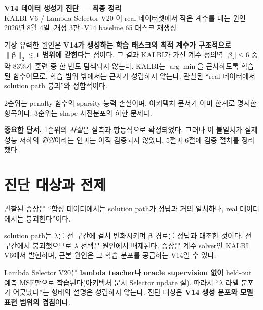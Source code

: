 \documentclass[11pt,a4paper]{article}
\theoremstyle{definition}
\newcommand{\bbeta}{\boldsymbol{\beta}}
\begin{document}
\begin{center}
{\LARGE\bfseries\color{ink} V14 데이터 생성기 진단 --- 최종 정리}\\[0.7em]
{\large\color{mut} KALBI V6 / Lambda Selector V20 이 real 데이터셋에서 작은 계수를 내는 원인}\\[1.2em]
{\small\color{mut} 2026년 8월 4일 \quad$\cdot$\quad 개정 3판 \quad$\cdot$\quad V14 baseline 65 태스크 재생성}
\end{center}
\vspace{0.8em}

\begin{keybox}
가장 유력한 원인은 \textbf{V14가 생성하는 학습 태스크의 최적 계수가 구조적으로 \(\lVert\bbeta\rVert_2\lesssim1\) 범위에 갇힌다}는 점이다. 그 결과 KALBI가 가진 계수 정의역 \(\lvert\beta_j\rvert\le6\) 중 약 \(83\%\)가 훈련 중 한 번도 탐색되지 않는다. KALBI는 \(\arg\min\)을 근사하도록 학습된 함수이므로, 학습 범위 밖에서는 근사가 성립하지 않는다. 관찰된 ``real 데이터에서 solution path 붕괴''와 정합적이다.

\smallskip
2순위는 penalty 함수의 sparsity 능력 손실이며, 아키텍처 문서가 이미 한계로 명시한 항목이다. 3순위는 shape 사전분포의 하한 문제다.

\smallskip
\textbf{중요한 단서.} 1순위의 \emph{사실}은 실측과 항등식으로 확정되었다. 그러나 이 불일치가 실제 성능 저하의 \emph{원인}이라는 인과는 아직 검증되지 않았다. 5절과 6절에 검증 절차를 정리했다.
\end{keybox}

\section{진단 대상과 전제}

관찰된 증상은 ``합성 데이터에서는 solution path가 정답과 거의 일치하나, real 데이터에서는 붕괴한다''이다.

solution path는 \(\lambda\)를 전 구간에 걸쳐 변화시키며 \(\bbeta\) 경로를 정답과 대조한 것이다. 전 구간에서 붕괴했으므로 \(\lambda\) 선택은 원인에서 배제된다. 증상은 계수 solver인 KALBI V6에서 발현하며, 근본 원인은 그 학습 분포를 공급하는 V14일 수 있다.

Lambda Selector V20은 \textbf{lambda teacher나 oracle supervision 없이} held-out 예측 MSE만으로 학습된다(아키텍처 문서 Selector update 절). 따라서 ``\(\lambda\) 라벨 분포가 어긋났다''는 형태의 설명은 성립하지 않는다. 진단 대상은 \textbf{V14 생성 분포와 모델 표현 범위의 겹침}이다.
\end{document}
